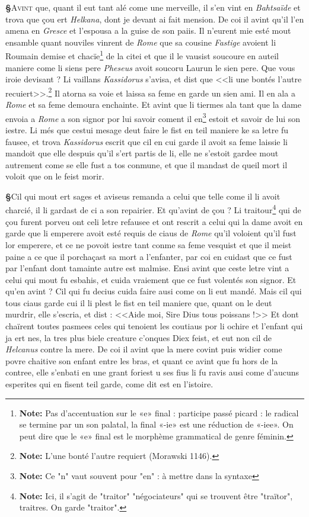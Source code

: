 \documentclass[12pt]{article} %
\newcommand{\persName}[1]{\emph{#1}} %
\newcommand{\placeName}[1]{\emph{#1}} %
\newcommand{\supplied}[1]{\textlangle#1\textrangle} %
\newcommand{\fnnote}[1]{\footnote{\textbf{Note:} #1}} %
\newcounter{paranum}
\newcommand{\pnum}{\stepcounter{paranum}\textbf{§\arabic{paranum}}\quad}
\begin{document}
\pnum \lettrine[lines=2]{\color{darkred}A}{vint} que, quant il eut tant alé come une merveille, il s'en vint en \placeName{Bahtsaïde} et trova que çou ert \persName{Helkana}, dont je devant ai fait mension. De coi il avint qu'il l'en amena en \placeName{Gresce} et l'espousa a la guise de son paiis. Il n'eurent mie esté mout ensamble quant nouviles vi\supplied{n}rent de \placeName{Rome} que sa cousine \persName{Fastige} avoient li Roumain demise et chacïe\fnnote{Pas d'accentuation sur le «e» final : participe passé picard : le radical se termine par un son palatal, la final «-ie» est une réduction de «-iee». On peut dire que le «e» final est le morphème grammatical de genre féminin.} de la citei et que il le vausist soucoure en auteil maniere come li siens pere \persName{Pheseus} avoit soucoru Laurun le sien pere. Que vous iroie devisant ? Li vaillans \persName{Kassidorus} s'avisa, et dist que <<li une bontés l'autre recuiert>>.\fnnote{L'une bonté l'autre requiert (Morawski 1146).} Il atorna sa voie et laissa sa feme en garde un sien ami. Il en ala a \placeName{Rome} et sa feme demoura enchainte. Et avint que li tiermes ala tant que la dame envoia a \placeName{Rome} a son signor por lui savoir coment il \supplied{e}n\fnnote{Ce "n" vaut souvent pour "en" : à mettre dans la syntaxe} estoit et savoir de lui son iestre. Li més que cestui mesage deut faire le fist en teil maniere ke sa letre fu fausee, et trova \persName{Kassidorus} escrit que cil en cui garde il avoit sa feme laissie li mandoit que elle despuis qu'il s'ert partis de li, elle ne s'estoit gardee mout autrement come se elle fust a tos conmune, et que il mandast de queil mort il voloit que on le feist morir.

\pnum Cil qui mout ert sages et aviseus remanda a celui que telle come il li avoit charcié, il li gardast de ci a son repairier. Et qu'avint de çou ? Li traitour\fnnote{Ici, il s'agit de "traitor" "négociateurs" qui se trouvent être "traïtor", traitres. On garde "traitor".} qui de çou furent porveu ont celi letre refausee et ont rescrit a celui qui la dame avoit en garde que li emperere avoit esté requis de ciaus de \placeName{Rome} qu'il voloient qu'il fust lor emperere, et ce ne povoit iestre tant conme sa feme vesquist et que il meist paine a ce que il porchaçast sa mort a l'enfanter, par coi en cuidast que ce fust par l'enfant dont tamainte autre est malmise. Ensi avint que ceste letre vint a celui qui mout fu esbahis, et cuida vraiement que ce fust volentés son signor. Et qu'en avint ? Cil qui fu decius cuida faire ausi come on li eut mandé. Mais cil qui tous ciaus garde cui il li plest le fist en teil maniere que, quant on le deut murdrir, elle s'escria, et dist : <<Aide moi, Sire Dius tous poissans !>> Et dont chaïrent toutes pasmees celes qui tenoient les coutiaus por li ochire et l'enfant qui ja ert nes, la tres plus biele creature c'onques Diex feist, et eut non cil de \persName{Helcanus} contre la mere. De coi il avint que la mere covint puis widier come povre chaitive son enfant entre les bras, et quant ce avint que fu hors de la contree, elle s'enbati en une grant foriest u ses fius li fu ravis ausi come d'aucuns esperites qui en fisent teil garde, come dit est en l'istoire.
\end{document}
